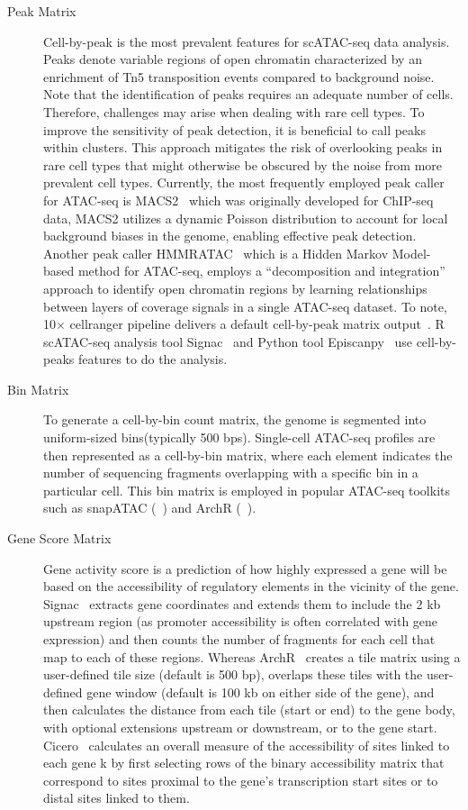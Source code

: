 \begin{description}
	\item[Peak Matrix]
	Cell-by-peak is the most prevalent features for scATAC-seq data analysis. Peaks denote variable regions of open chromatin characterized by an enrichment of Tn5 transposition events compared to background noise. Note that the identification of peaks requires an adequate number of cells. Therefore, challenges may arise when dealing with rare cell types. To improve the sensitivity of peak detection, it is beneficial to call peaks within clusters. This approach mitigates the risk of overlooking peaks in rare cell types that might otherwise be obscured by the noise from more prevalent cell types. Currently, the most frequently employed peak caller for ATAC-seq is MACS2~\citep{zhang2008macs2} which was originally developed for ChIP-seq data, MACS2 utilizes a dynamic Poisson distribution to account for local background biases in the genome, enabling effective peak detection. Another peak caller HMMRATAC~\citep{tarbell2019hmmratac} which is a Hidden Markov Model-based method for ATAC-seq, employs a ``decomposition and integration'' approach to identify open chromatin regions by learning relationships between layers of coverage signals in a single ATAC-seq dataset. To note, 10$\times$ cellranger pipeline delivers a default cell-by-peak matrix output~\citep{satpathy2019massively}. R scATAC-seq analysis tool Signac~\citep{signac} and Python tool Episcanpy~\citep{Danese2021episcanpy} use cell-by-peaks features to do the analysis.

	\item[Bin Matrix]
	To generate a cell-by-bin count matrix, the genome is segmented into uniform-sized bins(typically 500 bps). Single-cell ATAC-seq profiles are then represented as a cell-by-bin matrix, where each element indicates the number of sequencing fragments overlapping with a specific bin in a particular cell. This bin matrix is employed in popular ATAC-seq toolkits such as snapATAC (~\citep{fang2021snapatac}) and ArchR (~\citep{Granja2021}).

	\item[Gene Score Matrix]
	Gene activity score is a prediction of how highly expressed a gene will be based on the accessibility of regulatory elements in the vicinity of the gene. Signac~\citep{signac} extracts gene coordinates and extends them to include the 2 kb upstream region (as promoter accessibility is often correlated with gene expression) and then counts the number of fragments for each cell that map to each of these regions. Whereas ArchR~\citep{granja2019single} creates a tile matrix using a user-defined tile size (default is 500 bp), overlaps these tiles with the user-defined gene window (default is 100 kb on either side of the gene), and then calculates the distance from each tile (start or end) to the gene body, with optional extensions upstream or downstream, or to the gene start. Cicero~\citep{pliner2018cicero} calculates an overall measure of the accessibility of sites linked to each gene k by first selecting rows of the binary accessibility matrix that correspond to sites proximal to the gene’s transcription start sites or to distal sites linked to them.
\end{description}

